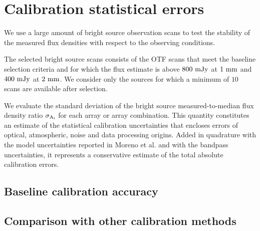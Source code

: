 

\section{Calibration statistical errors}
\label{se:calibration_rms}

We use a large amount of bright source observation scans to test the
stability of the measured flux densities with respect to the observing
conditions.

The selected bright source scans consists of the OTF scans that meet
the baseline selection criteria and for which the flux estimate is
above $800~\rm{mJy}$ at $1~\rm{mm}$ and $400~\rm{mJy}$ at
$2~\rm{mm}$. We consider only the sources for which a minimum of $10$
scans are available after selection.  

We evaluate the standard deviation of the bright source measured-to-median flux
density ratio $\sigma_{\rm A_i}$ for each array or array combination. 
This quantity constitutes an estimate of the statistical calibration
uncertainties that encloses errors of optical, atmospheric, noise and
data processing origins.
Added in quadrature with the model uncertainties reported in
Moreno et al. and with the bandpass uncertainties, it represents a
conservative estimate of the total absolute calibration errors.


\subsection{Baseline calibration accuracy}



\subsection{Comparison with other calibration methods}
